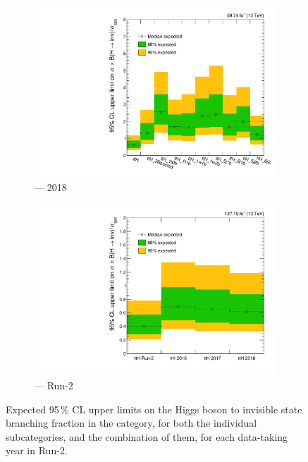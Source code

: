 \begin{figure}[htbp]
    \begin{subfigure}[b]{0.45\textwidth}
        \includegraphics[width=\textwidth]{figures/limits/ttH/limit_2018_ttH_Scenario5.pdf}
        \caption{\ttH --- 2018}
    \end{subfigure}
    \hfill
    \begin{subfigure}[b]{0.45\textwidth}
        \includegraphics[width=\textwidth]{figures/limits/ttH/limit_Run2_ttH_Scenario5.pdf}
        \caption{\ttH --- Run-2}
    \end{subfigure}
    \caption[Expected 95\,\% CL upper limits on the Higgs boson to invisible state branching fraction in the \ttH category, for both the individual subcategories, and the combination of them, for each data-taking year in Run-2]{Expected 95\,\% CL upper limits on the Higgs boson to invisible state branching fraction in the \ttH category, for both the individual subcategories, and the combination of them, for each data-taking year in Run-2.}
    \label{fig:htoinv_limit_ttH}
\end{figure}

